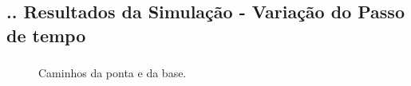 \documentclass[aspectratio=169]{beamer}
\begin{document}
\subsection{\insertsectionnumber .\insertsubsectionnumber . Resultados da Simulação - Variação do Passo de tempo}

\begin{frame}
  \frametitle{\insertsubsection}
  \begin{figure}[H]
    \centering
    \caption{Caminhos da ponta e da base.}
    \hfill
  \end{figure}
\end{frame}
\end{document}
